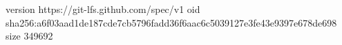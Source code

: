 version https://git-lfs.github.com/spec/v1
oid sha256:a6f03aad1de187cde7cb5796fadd36f6aac6c5039127e3fe43e9397e678de698
size 349692
